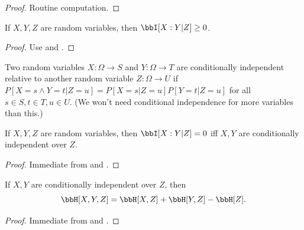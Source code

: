 \begin{proof}\leanok Routine computation.
\end{proof}

\begin{lemma}
\label{conditional-nonneg}
\leanok
If $X,Y,Z$ are random variables, then $\bbI[X:Y|Z] \ge 0$.
\end{lemma}
\begin{proof}
\leanok
Use  and .
\end{proof}

\begin{definition}
\label{conditional-independent-def}
\leanok
  Two random variables $X: \Omega \to S$ and $Y: \Omega \to T$ are conditionally independent relative to another random variable $Z: \Omega \to U$ if $P[X = s \wedge Y = t| Z=u] = P[X=s|Z=u] P[Y=t|Z=u]$ for all $s \in S, t \in T, u \in U$.  (We won't need conditional independence for more variables than this.)
\end{definition}

\begin{lemma}\label{conditional-vanish}
  \leanok
  If $X,Y,Z$ are random variables, then $\bbI[X:Y|Z] = 0$ iff $X,Y$ are conditionally independent over $Z$.
\end{lemma}

\begin{proof} \leanok Immediate from  and .
\end{proof}

\begin{corollary}\label{cond-trial-ent}
  \leanok
  If $X, Y$ are conditionally independent over $Z$, then
  $$ \bbH[X,Y,Z] =\bbH[X,Z] + \bbH[Y,Z] - \bbH[Z].$$
\end{corollary}

\begin{proof} \leanok Immediate from  and .
\end{proof}


